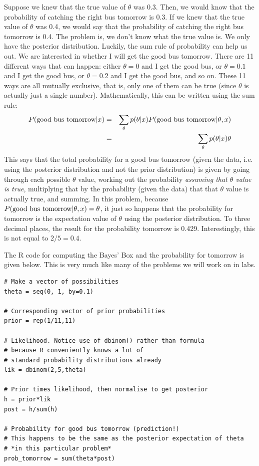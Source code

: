 Suppose we knew that the true value of $\theta$ was 0.3. Then, we would know that
the probability of catching the right bus tomorrow is 0.3. If we knew that the
true value of $\theta$ was 0.4, we would say that the probability of catching
the right bus tomorrow is 0.4. The problem is, we don't know what the true value
is. We only have the posterior distribution. Luckily, the sum rule of
probability can help us out. We are interested in whether I will get the good
bus tomorrow. There are 11 different ways that can happen: either $\theta=0$ and
I get the good bus, or $\theta=0.1$ and I get the good bus, or $\theta=0.2$ and
I get the good bus, and so on. These 11 ways are all mutually exclusive, that is,
only one of them can be true (since $\theta$ is actually just a single number).
Mathematically, this can be written using the sum rule:
\begin{eqnarray}
P(\textnormal{good bus tomorrow} | x) &=& \sum_{\theta}
p(\theta | x)P(\textnormal{good bus tomorrow} | \theta, x)\\
&=& \sum_{\theta}
p(\theta | x)\theta
\end{eqnarray}
This says that the total probability for a good bus tomorrow (given the data,
i.e. using the posterior distribution and not the prior distribution)
is given by going through each possible $\theta$ value, working out the probability
{\it assuming that $\theta$ value is true}, multiplying that by the probability
(given the data) that that $\theta$ value is actually true, and summing. In this
problem, because $P(\textnormal{good bus tomorrow} | \theta, x) = \theta$, it
just so happens that the probability for tomorrow is the expectation value of
$\theta$ using the posterior distribution. To three decimal places, the result
for the probability tomorrow is 0.429. Interestingly, this is not equal to
$2/5 = 0.4$.

The R code for computing the Bayes' Box and the probability for tomorrow
is given below. This is
very much like many of the problems we will work on in labs.

\begin{framed}
\begin{verbatim}
# Make a vector of possibilities
theta = seq(0, 1, by=0.1)

# Corresponding vector of prior probabilities
prior = rep(1/11,11)

# Likelihood. Notice use of dbinom() rather than formula
# because R conveniently knows a lot of
# standard probability distributions already
lik = dbinom(2,5,theta)

# Prior times likelihood, then normalise to get posterior
h = prior*lik
post = h/sum(h)

# Probability for good bus tomorrow (prediction!)
# This happens to be the same as the posterior expectation of theta
# *in this particular problem*
prob_tomorrow = sum(theta*post)
\end{verbatim}
\end{framed}

